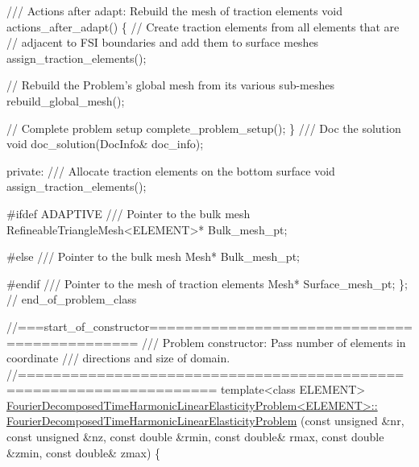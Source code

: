 \begin{DoxyCodeInclude}
\textcolor{comment}{}
\textcolor{comment}{ /// Actions after adapt: Rebuild the mesh of traction elements}
\textcolor{comment}{} \textcolor{keywordtype}{void} actions\_after\_adapt()
  \{
   \textcolor{comment}{// Create traction elements from all elements that are }
   \textcolor{comment}{// adjacent to FSI boundaries and add them to surface meshes}
   assign\_traction\_elements();
   
   \textcolor{comment}{// Rebuild the Problem's global mesh from its various sub-meshes}
   rebuild\_global\_mesh();
   
   \textcolor{comment}{// Complete problem setup}
   complete\_problem\_setup();   
  \}
\textcolor{comment}{}
\textcolor{comment}{ /// Doc the solution}
\textcolor{comment}{} \textcolor{keywordtype}{void} doc\_solution(DocInfo& doc\_info);
 
\textcolor{keyword}{private}:
 \textcolor{comment}{}
\textcolor{comment}{ /// Allocate traction elements on the bottom surface}
\textcolor{comment}{} \textcolor{keywordtype}{void} assign\_traction\_elements();
 
\textcolor{preprocessor}{#ifdef ADAPTIVE}
\textcolor{comment}{}
\textcolor{comment}{ /// Pointer to the bulk mesh}
\textcolor{comment}{} RefineableTriangleMesh<ELEMENT>* Bulk\_mesh\_pt;

\textcolor{preprocessor}{#else}
\textcolor{comment}{}
\textcolor{comment}{ /// Pointer to the bulk mesh}
\textcolor{comment}{} Mesh* Bulk\_mesh\_pt;

\textcolor{preprocessor}{#endif}
 \textcolor{comment}{}
\textcolor{comment}{ /// Pointer to the mesh of traction elements}
\textcolor{comment}{} Mesh* Surface\_mesh\_pt;
\}; \textcolor{comment}{// end\_of\_problem\_class}


\textcolor{comment}{//===start\_of\_constructor=============================================}\textcolor{comment}{}
\textcolor{comment}{/// Problem constructor: Pass number of elements in coordinate}
\textcolor{comment}{/// directions and size of domain.}
\textcolor{comment}{}\textcolor{comment}{//====================================================================}
\textcolor{keyword}{template}<\textcolor{keyword}{class} ELEMENT>
\hyperlink{classFourierDecomposedTimeHarmonicLinearElasticityProblem_a52597ec969cbd2aaa9fde263594c1c32}{FourierDecomposedTimeHarmonicLinearElasticityProblem<ELEMENT>::}
\hyperlink{classFourierDecomposedTimeHarmonicLinearElasticityProblem_a52597ec969cbd2aaa9fde263594c1c32}{FourierDecomposedTimeHarmonicLinearElasticityProblem}
(\textcolor{keyword}{const} \textcolor{keywordtype}{unsigned} &nr, \textcolor{keyword}{const} \textcolor{keywordtype}{unsigned} &nz,
 \textcolor{keyword}{const} \textcolor{keywordtype}{double} &rmin, \textcolor{keyword}{const} \textcolor{keywordtype}{double}& rmax,
 \textcolor{keyword}{const} \textcolor{keywordtype}{double} &zmin, \textcolor{keyword}{const} \textcolor{keywordtype}{double}& zmax)
\{


\end{DoxyCodeInclude}
